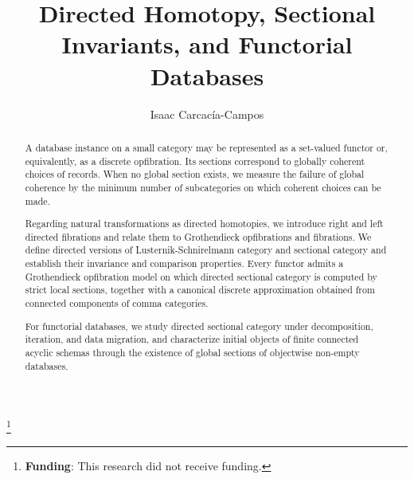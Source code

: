 \documentclass[12pt]{amsart}
\theoremstyle{definition}
\theoremstyle{remark}
\numberwithin{figure}{section}%
\begin{document}
\title[Directed Homotopy, Sectional Invariants, and Databases]{Directed Homotopy, Sectional Invariants, and Functorial Databases}
\thanks{\textbf{Funding}: This research did not receive funding.}


\author[Isaac Carcacía-Campos]{%
	Isaac Carcacía-Campos%
}


		
 \address{%
           	Isaac Carcacía-Campos
            \\
              Departamento de Matem\'aticas, Universidade de Santiago de Compostela, 15782-SPAIN}









\begin{abstract} 
A database instance on a small category may be represented as a set-valued functor or, equivalently, as a discrete opfibration. Its sections correspond to globally coherent choices of records. When no global section exists, we measure the failure of global coherence by the minimum number of subcategories on which coherent choices can be made.

Regarding natural transformations as directed homotopies, we introduce right and left directed fibrations and relate them to Grothendieck opfibrations and fibrations. We define directed versions of Lusternik-Schnirelmann category and sectional category and establish their invariance and comparison properties. Every functor admits a Grothendieck opfibration model on which directed sectional category is computed by strict local sections, together with a canonical discrete approximation obtained from connected components of comma categories.

For functorial databases, we study directed sectional category under decomposition, iteration, and data migration, and characterize initial objects of finite connected acyclic schemas through the existence of global sections of objectwise non-empty databases.
\end{abstract}


\end{document}
